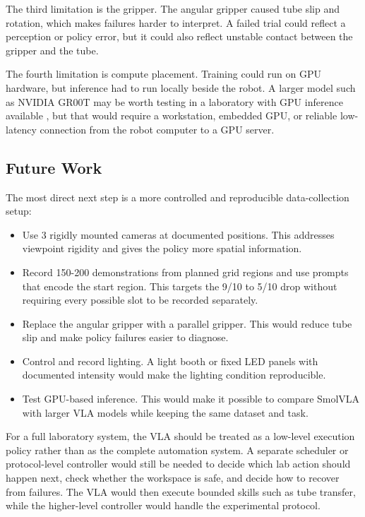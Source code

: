 \documentclass[11pt, a4paper]{article}
\begin{document}
The third limitation is the gripper. The angular gripper caused tube slip and rotation, which makes failures harder to interpret. A failed trial could reflect a perception or policy error, but it could also reflect unstable contact between the gripper and the tube.

The fourth limitation is compute placement. Training could run on GPU hardware, but inference had to run locally beside the robot. A larger model such as NVIDIA GR00T may be worth testing in a laboratory with GPU inference available \parencite{bjorck2025groot}, but that would require a workstation, embedded GPU, or reliable low-latency connection from the robot computer to a GPU server.

\subsection{Future Work}

The most direct next step is a more controlled and reproducible data-collection setup:

\begin{itemize}
    \item Use 3 rigidly mounted cameras at documented positions. This addresses viewpoint rigidity and gives the policy more spatial information.

    \item Record 150-200 demonstrations from planned grid regions and use prompts that encode the start region. This targets the 9/10 to 5/10 drop without requiring every possible slot to be recorded separately.

    \item Replace the angular gripper with a parallel gripper. This would reduce tube slip and make policy failures easier to diagnose.

    \item Control and record lighting. A light booth or fixed LED panels with documented intensity would make the lighting condition reproducible.

    \item Test GPU-based inference. This would make it possible to compare SmolVLA with larger VLA models while keeping the same dataset and task.
\end{itemize}

For a full laboratory system, the VLA should be treated as a low-level execution policy rather than as the complete automation system. A separate scheduler or protocol-level controller would still be needed to decide which lab action should happen next, check whether the workspace is safe, and decide how to recover from failures. The VLA would then execute bounded skills such as tube transfer, while the higher-level controller would handle the experimental protocol.
\end{document}
